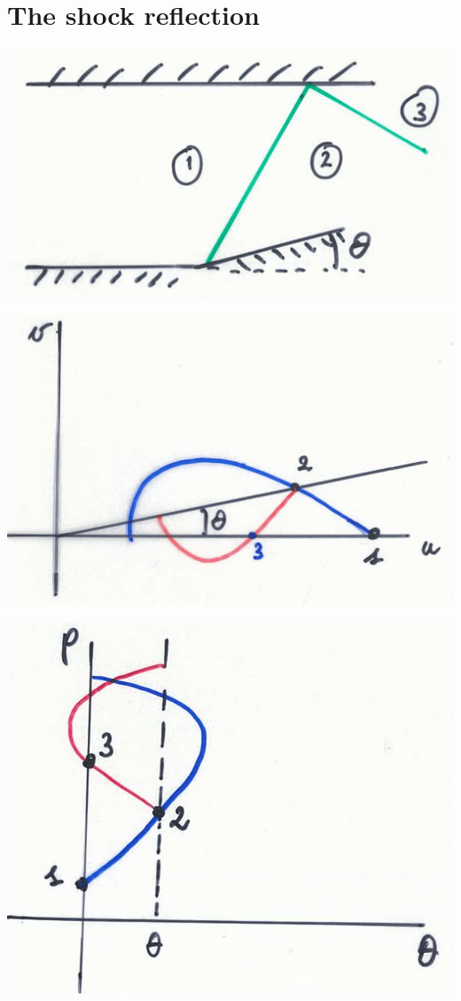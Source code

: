 \section{The shock reflection}
\begin{center}
\begin{minipage}{0.33\textwidth}
\includegraphics[scale=0.15]{ch9/5}
\end{minipage}
\begin{minipage}{0.35\textwidth}
\includegraphics[scale=0.12]{ch9/6}
\end{minipage}
\begin{minipage}{0.25\textwidth}
\includegraphics[scale=0.11]{ch9/7}

\end{minipage}
\end{center}
